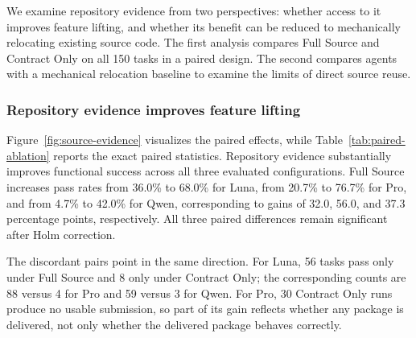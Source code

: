 \documentclass[acmsmall,screen,review,anonymous]{acmart}
\begin{document}
We examine repository evidence from two perspectives: whether access to it
improves feature lifting, and whether its benefit can be reduced to mechanically
relocating existing source code. The first analysis compares Full Source and
Contract Only on all 150 tasks in a paired design. The second compares agents
with a mechanical relocation baseline to examine the limits of direct source
reuse.

\subsubsection{Repository evidence improves feature lifting}

Figure~\ref{fig:source-evidence} visualizes the paired effects, while
Table~\ref{tab:paired-ablation} reports the exact paired statistics.
Repository evidence substantially improves functional success across all three
evaluated configurations. Full Source increases pass rates from 36.0\% to
68.0\% for Luna, from 20.7\% to 76.7\% for Pro, and from 4.7\% to 42.0\%
for Qwen, corresponding to gains of 32.0, 56.0, and 37.3 percentage points,
respectively. All three paired differences remain significant after Holm
correction.

The discordant pairs point in the same direction. For Luna, 56 tasks pass only
under Full Source and 8 only under Contract Only; the corresponding counts are
88 versus 4 for Pro and 59 versus 3 for Qwen. For Pro, 30 Contract Only runs
produce no usable submission, so part of its gain reflects whether any package
is delivered, not only whether the delivered package behaves correctly.
\end{document}
